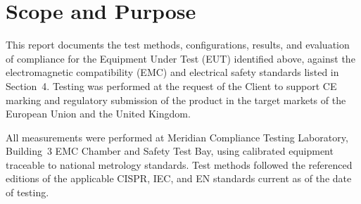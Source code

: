 \section{Scope and Purpose}
This report documents the test methods, configurations, results, and evaluation of compliance for the Equipment Under Test (EUT) identified above, against the electromagnetic compatibility (EMC) and electrical safety standards listed in Section~4. Testing was performed at the request of the Client to support CE marking and regulatory submission of the product in the target markets of the European Union and the United Kingdom.

All measurements were performed at Meridian Compliance Testing Laboratory, Building~3 EMC Chamber and Safety Test Bay, using calibrated equipment traceable to national metrology standards. Test methods followed the referenced editions of the applicable CISPR, IEC, and EN standards current as of the date of testing.

